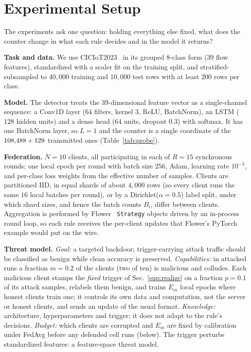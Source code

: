 \documentclass[journal]{IEEEtran}
\begin{document}
\section{Experimental Setup}
\label{sec:setup}

The experiments ask one question: holding everything else fixed, what does the
counter change in what each rule decides and in the model it returns?

\textbf{Task and data.} We use CICIoT2023~\cite{neto2023ciciot} in its grouped
8-class form ($39$ flow features), standardized with a scaler fit on the training
split, and stratified-subsampled to $40{,}000$ training and $10{,}000$ test rows
with at least $200$ rows per class.

\textbf{Model.} The detector treats the $39$-dimensional feature vector as a
single-channel sequence: a Conv1D layer ($64$ filters, kernel $3$, ReLU,
BatchNorm), an LSTM ($128$ hidden units) and a dense head ($64$ units, dropout
$0.3$) with softmax. It has one BatchNorm layer, so $L=1$ and the counter is a
single coordinate of the $108{,}488{}+129$ transmitted ones
(Table~\ref{tab:probe}).

\textbf{Federation.} $N=10$ clients, all participating in each of $R=15$
synchronous rounds; one local epoch per round with batch size $256$, Adam,
learning rate $10^{-3}$, and per-class loss weights from the effective number of
samples. Clients are partitioned IID, in equal shards of about $4{,}000$ rows (so every
client runs the same $16$ local batches per round), or by a Dirichlet($\alpha=0.5$)
label split, under which shard sizes, and hence the batch counts $B_i$, differ
between clients. Aggregation is performed by Flower~\cite{beutel2020flower}
\texttt{Strategy} objects driven by an in-process round loop, so each rule
receives the per-client \sd{} updates that Flower's PyTorch example would put on
the wire.

\textbf{Threat model.} \emph{Goal:} a targeted backdoor; trigger-carrying attack
traffic should be classified as benign while clean accuracy is preserved.
\emph{Capabilities:} in attacked runs a fraction $m=0.2$ of the clients (two of
ten) is malicious and colludes. Each malicious client stamps the \emph{fixed}
trigger of Sec.~\ref{sup:realize} on a fraction $p=0.1$ of its attack samples,
relabels them benign, and trains $E_m$ local epochs where honest clients train
one; it controls its own data and computation, not the server or honest clients,
and sends an update of the usual format. \emph{Knowledge:} architecture,
hyperparameters and trigger; it does not adapt to the rule's decisions.
\emph{Budget:} which clients are corrupted and $E_m$ are fixed by calibration under
FedAvg before any defended cell runs (below). The trigger perturbs standardized
features: a feature-space threat model.
\end{document}
